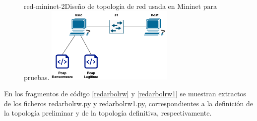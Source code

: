 \begin{figure}[Topología de Red Final]{red-mininet-2}{Diseño de topología de red usada en Mininet para pruebas.}
	\includegraphics[width=0.55\textwidth]{capturas/DiagramaRed2.png}
\end{figure}

En los fragmentos de código \ref{redarbolrw} y \ref{redarbolrw1} se muestran extractos de los ficheros redarbolrw.py y redarbolrw1.py, correspondientes a la definición de la topología preliminar y de la topología definitiva, respectivamente.


